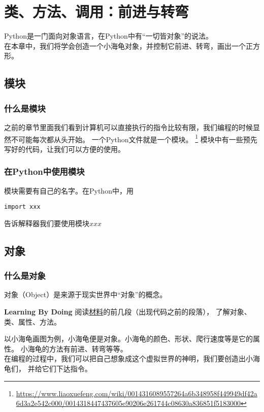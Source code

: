 \chapter{类、方法、调用：前进与转弯}
Python是一门面向对象语言，在Python中有“一切皆对象”的说法。\\
在本章中，我们将学会创造一个小海龟对象，并控制它前进、转弯，画出一个正方形。
\section{模块}
\subsection{什么是模块}
之前的章节里面我们看到计算机可以直接执行的指令比较有限，我们编程的时候显然不可能每次都从头开始。
一个Python文件就是一个模块。
\footnote{\url{https://www.liaoxuefeng.com/wiki/0014316089557264a6b348958f449949df42a6d3a2e542c000/0014318447437605e90206e261744c08630a836851f5183000}}
模块中有一些预先写好的代码，让我们可以方便的使用。\\
\subsection{在Python中使用模块}
模块需要有自己的名字。在Python中，用
\begin{lstlisting}[style=PythonStyle1]
	import xxx
\end{lstlisting}
告诉解释器我们要使用模块$xxx$
\section{对象}
\subsection{什么是对象}
对象（Object）是来源于现实世界中“对象”的概念。
\begin{paperbox}{\textbf{Learning By Doing}\starfive}
阅读\href{http://blog.csdn.net/linyixiao88/article/details/50833502}{材料}的前几段（出现代码之前的段落），
了解对象、类、属性、方法。
\end{paperbox}
以小海龟画图为例，小海龟便是对象。小海龟的颜色、形状、爬行速度等是它的属性。
小海龟的方法有前进、转弯等等。\\
在编程的过程中，我们可以把自己想象成这个虚拟世界的神明，我们要创造出小海龟们，
并给它们下达指令。\\

